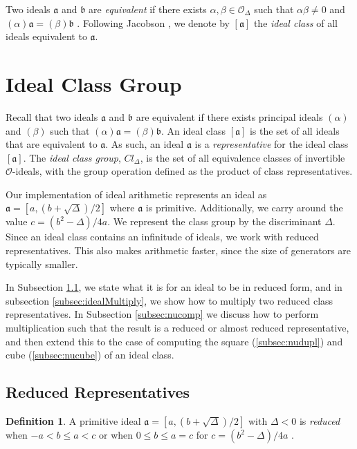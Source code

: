 \documentclass{ucalgthes1}
\theoremstyle{definition}
\newtheorem{defn}[thm]{Definition}
\newcommand{\OO}{\mathcal{O}}
\begin{document}
Two ideals $\mathfrak a$ and $\mathfrak b$ are \emph{equivalent} if there exists $\alpha, \beta \in \OO_\Delta$ such that $\alpha \beta \neq 0$ and $(\alpha)\mathfrak a = (\beta) \mathfrak b$ \cite[p.88]{Jacobson2009}. Following Jacobson \cite[p.88]{Jacobson2009}, we denote by $[\mathfrak a]$ the \emph{ideal class} of all ideals equivalent to $\mathfrak a$. 


\bigbreak
\section{Ideal Class Group}

Recall that two ideals $\mathfrak a$ and $\mathfrak b$ are equivalent if there exists principal ideals $(\alpha)$ and $(\beta)$ such that $(\alpha)\mathfrak a = (\beta)\mathfrak b$.  An ideal class $[\mathfrak a]$ is the set of all ideals that are equivalent to $\mathfrak a$. As such, an ideal $\mathfrak a$ is a \emph{representative} for the ideal class $[\mathfrak a]$. The \emph{ideal class group}, $Cl_\Delta$, is the set of all equivalence classes of invertible $\OO$-ideals, with the group operation defined as the product of class representatives.

Our implementation of ideal arithmetic represents an ideal as $\mathfrak a = [a, (b + \sqrt\Delta)/2]$ where $\mathfrak a$ is primitive.  Additionally, we carry around the value $c = (b^2 - \Delta)/4a$.  We represent the class group by the discriminant $\Delta$. Since an ideal class contains an infinitude of ideals, we work with reduced representatives.  This also makes arithmetic faster, since the size of generators are typically smaller.

In Subsection \ref{subsec:reduction}, we state what it is for an ideal to be in reduced form, and in subsection \ref{subsec:idealMultiply}, we show how to multiply two reduced class representatives. In Subsection \ref{subsec:nucomp} we discuss how to perform multiplication such that the result is a reduced or almost reduced representative, and then extend this to the case of computing the square (\ref{subsec:nudupl}) and cube (\ref{subsec:nucube}) of an ideal class.  


\subsection{Reduced Representatives}
\label{subsec:reduction}

\begin{defn}
\label{defn:reducedIdeal}
A primitive ideal $\mathfrak{a} = [a, (b+\sqrt{\Delta})/2]$ with $\Delta < 0$ is \emph{reduced} when $-a < b \le a < c$ or when $0 \le b \le a = c$ for $c = (b^2 - \Delta)/4a$ \cite[p.241]{Crandall2001}.
\end{defn}
\end{document}

